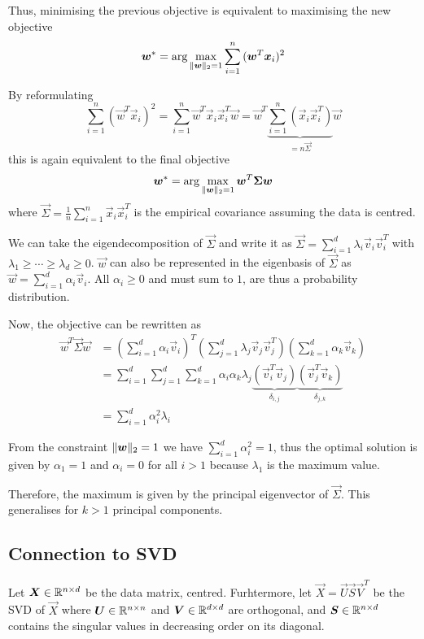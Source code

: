 Thus, minimising the previous objective is equivalent to
maximising the new objective
\begin{equation*}
\boldsymbol{w}^* = \arg\max_{\lVert\boldsymbol{w}\rVert_2 = 1}{
	\sum_{i=1}^n{(\boldsymbol{w}^T \boldsymbol{x}_i)^2}
}
\end{equation*}

By reformulating
\begin{equation*}
\sum_{i=1}^n{(\vec{w}^T \vec{x}_i)^2}
= \sum_{i=1}^n{\vec{w}^T \vec{x}_i \vec{x}_i^T \vec{w}}
= \vec{w}^T \underbrace{\sum_{i=1}^n{(\vec{x}_i \vec{x}_i^T)}}_{= n \vec{\Sigma}} \vec{w}
\end{equation*}
this is again equivalent to the final objective
\begin{equation*}
\boldsymbol{w}^* = \arg\max_{\lVert\boldsymbol{w}\rVert_2 = 1}{
	\boldsymbol{w}^T \boldsymbol{\Sigma} \boldsymbol{w}
}
\end{equation*}
where $\vec{\Sigma} = \frac{1}{n} \sum_{i=1}^n{\vec{x}_i \vec{x}_i^T}$ is the empirical covariance assuming the
data is centred.

We can take the eigendecomposition of $\vec{\Sigma}$ and
write it as
$\vec{\Sigma} = \sum_{i=1}^d{\lambda_i \vec{v}_i \vec{v}_i^T}$
with $\lambda_1 \geq \dotsb \geq \lambda_d \geq 0$.
$\vec{w}$ can also be represented in the eigenbasis
of $\vec{\Sigma}$ as
$\vec{w} = \sum_{i=1}^d{\alpha_i \vec{v}_i}$.
All $\alpha_i \geq 0$ and must sum to $1$,
are thus a probability distribution.

Now, the objective can be rewritten as
\begin{align*}
\vec{w}^T \vec{\Sigma} \vec{w}
&= \left(
\sum_{i=1}^d{\alpha_i \vec{v}_i}
\right)^T \left(
\sum_{j=1}^d{\lambda_j \vec{v}_j \vec{v}_j^T}
\right) \left(
\sum_{k=1}^d{\alpha_k \vec{v}_k}
\right) \\
&= \sum_{i=1}^d{\sum_{j=1}^d{\sum_{k=1}^d{
			\alpha_i \alpha_k \lambda_j
			\underbrace{(\vec{v}_i^T \vec{v}_j)}_{\delta_{i,j}}
			\underbrace{(\vec{v}_j^T \vec{v}_k)}_{\delta_{j,k}}
}}} \\
&= \sum_{i=1}^d{\alpha_i^2 \lambda_i}
\end{align*}

From the constraint $\lVert\boldsymbol{w}\rVert_2 = 1$ we have
$\sum_{i=1}^d{\alpha_i^2} = 1$,
thus the optimal solution is given by
$\alpha_1 = 1$ and $\alpha_i = 0$ for all $i > 1$
because $\lambda_1$ is the maximum value.

Therefore, the maximum is given by the principal eigenvector
of $\vec{\Sigma}$.
This generalises for $k > 1$ principal components.


\subsection{Connection to SVD}
Let $\boldsymbol{X} \in \mathbb{R}^{n \times d}$ be the data matrix,
centred.
Furhtermore, let $\vec{X} = \vec{U} \vec{S} \vec{V}^T$ be
the SVD of $\vec{X}$ where $\boldsymbol{U} \in \mathbb{R}^{n \times n}$
and $\boldsymbol{V} \in \mathbb{R}^{d \times d}$ are orthogonal,
and $\boldsymbol{S} \in \mathbb{R}^{n \times d}$ contains the singular
values in decreasing order on its diagonal.

